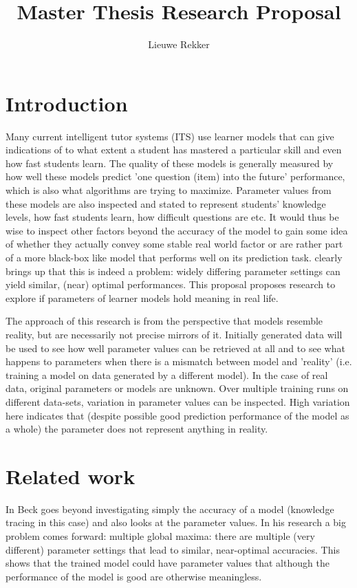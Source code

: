 \documentclass{article}
\begin{document}
\title{Master Thesis Research Proposal}
\author{Lieuwe Rekker}
\maketitle
\nocite{labelcombi}
\nocite{lftransfer}
\nocite{offtaskmodel}
\nocite{POKS1}
\nocite{matrixfact}
\nocite{importance}
\nocite{knowledgeproblem}
\nocite{modelreview}
\nocite{engagement}
\nocite{engageproficiency}
\nocite{eirt}
\nocite{pfa}
\nocite{ktpfa}

\section{Introduction}
Many current intelligent tutor systems (ITS) use learner models that can give indications of to what extent a student has mastered a particular skill and even how fast students learn. The quality of these models is generally measured by how well these models predict 'one question (item) into the future' performance, which is also what algorithms are trying to maximize. Parameter values from these models are also inspected and stated to represent students' knowledge levels, how fast students learn, how difficult questions are etc. It would thus be wise to inspect other factors beyond the accuracy of the model to gain some idea of whether they actually convey some stable real world factor or are rather part of a more black-box like model that performs well on its prediction task. \cite{knowledgeproblem} clearly brings up that this is indeed a problem: widely differing parameter settings can yield similar, (near) optimal performances. This proposal proposes research to explore if parameters of learner models hold meaning in real life.

The approach of this research is from the perspective that models resemble reality, but are necessarily not precise mirrors of it. Initially generated data will be used to see how well parameter values can be retrieved at all and to see what happens to parameters when there is a mismatch between model and 'reality' (i.e. training a model on data generated by a different model). In the case of real data, original parameters or models are unknown. Over multiple training runs on different data-sets, variation in parameter values can be inspected. High variation here indicates that (despite possible good prediction performance of the model as a whole) the parameter does not represent anything in reality.



\section{Related work}
In \cite{knowledgeproblem} Beck goes beyond investigating simply the accuracy of a model (knowledge tracing in this case) and also looks at the parameter values. In his research a big problem comes forward: multiple global maxima: there are multiple (very different) parameter settings that lead to similar, near-optimal accuracies. This shows that the trained model could have parameter values that although the performance of the model is good are otherwise meaningless.
\end{document}
